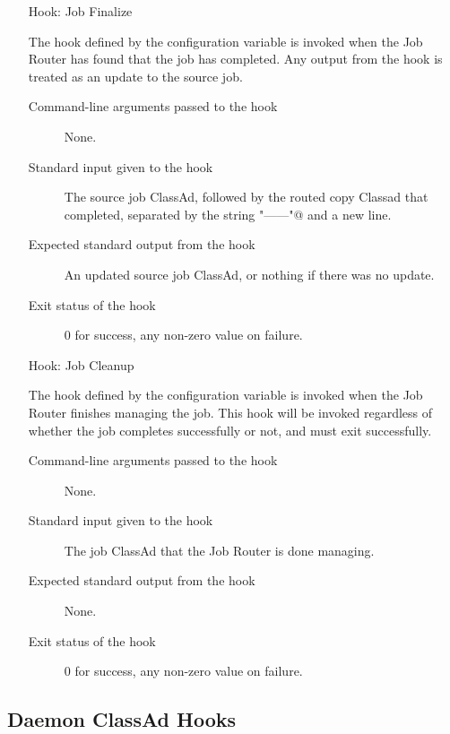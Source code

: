 \begin{itemize}
\item[Hook: Job Finalize]

  The hook defined by the configuration variable 
  is invoked when the Job Router has found that the job has completed.
  Any output from the hook is treated as an update to the source job.

\begin{description}
\item[Command-line arguments passed to the hook]
  None.
\item[Standard input given to the hook]
  The source job ClassAd, followed by the routed copy Classad that completed,
  separated by the string \verb@"------"@ and a new line.
\item[Expected standard output from the hook]
  An updated source job ClassAd, or nothing if there was no update.
\item[Exit status of the hook]
  0 for success, any non-zero value on failure.
\end{description}

\item[Hook: Job Cleanup]

  The hook defined by the configuration variable 
  is invoked when the Job Router finishes managing the job.
  This hook will be invoked regardless of whether the job
  completes successfully or not,
  and must exit successfully.

\begin{description}
\item[Command-line arguments passed to the hook]
  None.
\item[Standard input given to the hook]
  The job ClassAd that the Job Router is done managing.
\item[Expected standard output from the hook]
  None.
\item[Exit status of the hook]
  0 for success, any non-zero value on failure.
\end{description}

\end{itemize}

\subsection{\label{sec:daemon-classad-hooks}
Daemon ClassAd Hooks}

